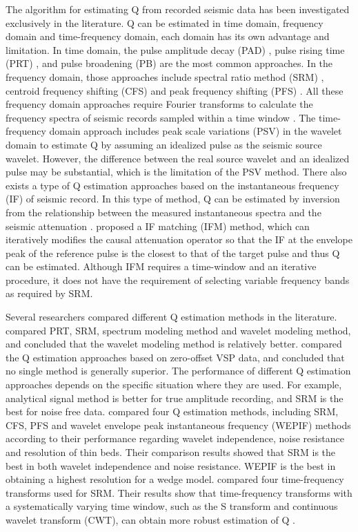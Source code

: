 The algorithm for estimating Q from recorded seismic data has been investigated exclusively in the literature. Q can be estimated in time domain, frequency domain and time-frequency domain, each domain has its own advantage and limitation. In time domain, the pulse amplitude decay (PAD) \cite[]{brzostowski1992}, pulse rising time (PRT) \cite[]{Kjartansson1979Constant}, and pulse broadening (PB) \cite[]{wright1981} are the most common approaches. In the frequency domain, those approaches include spectral ratio method (SRM) \cite[]{hauge1981,raikes1984}, centroid frequency shifting (CFS) \cite[]{quan1997} and peak frequency shifting (PFS) \cite[]{changjun2002,jinghuai2007}. All these frequency domain approaches require Fourier transforms to calculate the frequency spectra of seismic records sampled within a time window \cite[]{senlin2009}.  The time-frequency domain approach includes peak scale variations (PSV) \cite[]{li2006} in the wavelet domain to estimate Q by assuming an idealized pulse as the seismic source wavelet. However, the difference between the real source wavelet and an idealized pulse may be substantial, which is the limitation of the PSV method. There also exists a type of Q estimation approaches based on the instantaneous frequency (IF) of seismic record. In this type of method, Q can be estimated by inversion from the relationship between the measured instantaneous spectra and the seismic attenuation \cite[]{tonn1991,barnes1991,engelhard1996}. \cite{matheney1995} proposed a IF matching (IFM) method, which can iteratively modifies the causal attenuation operator \cite[]{akirichards.2002} so that the IF at the envelope peak of the reference pulse is the closest to that of the target pulse and thus Q can be estimated. Although IFM requires a time-window and an iterative procedure, it does not have the requirement of selecting variable frequency bands as required by SRM. 

Several researchers compared different Q estimation methods in the literature. \cite{jannsen1985} compared PRT, SRM, spectrum modeling method and wavelet modeling method, and concluded that the wavelet modeling method is relatively better. \cite{tonn1991} compared the Q estimation approaches based on zero-offset VSP data, and concluded that no single method is generally superior. The performance of different Q estimation approaches depends on the specific situation where they are used. For example, analytical signal method is better for true amplitude recording, and SRM is the best for noise free data. \cite{senlin2009} compared four Q estimation methods, including SRM, CFS, PFS and wavelet envelope peak instantaneous frequency (WEPIF) methods according to their performance regarding wavelet independence, noise resistance and resolution of thin beds. Their comparison results showed that SRM is the best in both wavelet independence and noise resistance. WEPIF is the best in obtaining a highest resolution for a wedge model. \cite{reine2009} compared four time-frequency transforms used for SRM. Their results show that time-frequency transforms with a systematically varying time window, such as the S transform and continuous wavelet transform (CWT), can obtain more robust estimation of Q \cite[]{guochang2010}.  

